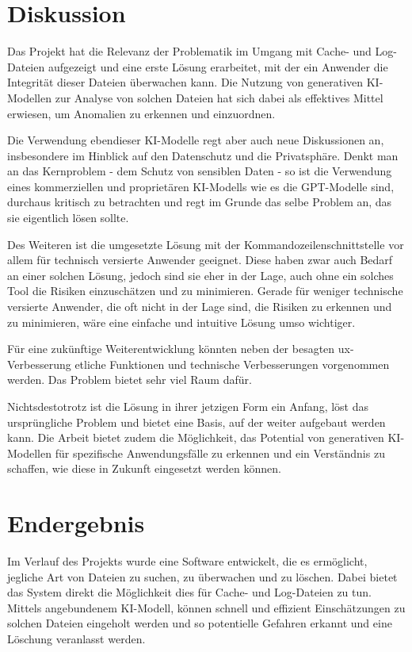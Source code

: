 \documentclass[a4paper,12pt]{report}
\begin{document}
    \section{Diskussion}
    Das Projekt hat die Relevanz der Problematik im Umgang mit Cache- und Log-Dateien aufgezeigt und eine erste Lösung erarbeitet, mit der ein Anwender die Integrität dieser Dateien überwachen kann.
    Die Nutzung von generativen KI-Modellen zur Analyse von solchen Dateien hat sich dabei als effektives Mittel erwiesen, um Anomalien zu erkennen und einzuordnen.

    Die Verwendung ebendieser KI-Modelle regt aber auch neue Diskussionen an, insbesondere im Hinblick auf den Datenschutz und die Privatsphäre.
    Denkt man an das Kernproblem - dem Schutz von sensiblen Daten - so ist die Verwendung eines kommerziellen und proprietären KI-Modells wie es die GPT-Modelle sind, durchaus kritisch zu betrachten
    und regt im Grunde das selbe Problem an, das sie eigentlich lösen sollte.

    Des Weiteren ist die umgesetzte Lösung mit der Kommandozeilenschnittstelle vor allem für technisch versierte Anwender geeignet.
    Diese haben zwar auch Bedarf an einer solchen Lösung, jedoch sind sie eher in der Lage, auch ohne ein solches Tool die Risiken einzuschätzen und zu minimieren.
    Gerade für weniger technische versierte Anwender, die oft nicht in der Lage sind, die Risiken zu erkennen und zu minimieren, wäre eine einfache und intuitive Lösung umso wichtiger.

    Für eine zukünftige Weiterentwicklung könnten neben der besagten \gls{ux}-Verbesserung etliche Funktionen und technische Verbesserungen vorgenommen werden.
    Das Problem bietet sehr viel Raum dafür.

    Nichtsdestotrotz ist die Lösung in ihrer jetzigen Form ein Anfang, löst das ursprüngliche Problem und bietet eine Basis, auf der weiter aufgebaut werden kann.
    Die Arbeit bietet zudem die Möglichkeit, das Potential von generativen KI-Modellen für spezifische Anwendungsfälle zu erkennen und ein Verständnis zu schaffen, wie diese in Zukunft eingesetzt werden können.

    \clearpage


    \section{Endergebnis}\label{sec:endergebnis}
    Im Verlauf des Projekts wurde eine Software entwickelt, die es ermöglicht, jegliche Art von Dateien zu suchen, zu überwachen und zu löschen.
    Dabei bietet das System direkt die Möglichkeit dies für Cache- und Log-Dateien zu tun.
    Mittels angebundenem KI-Modell, können schnell und effizient Einschätzungen zu solchen Dateien eingeholt werden und so potentielle Gefahren erkannt und eine Löschung veranlasst werden.
\end{document}
